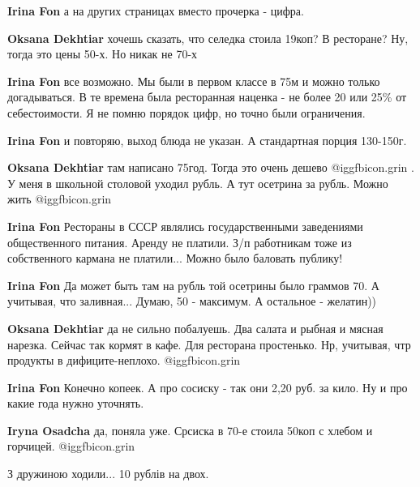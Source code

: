 \begin{itemize}
\begin{itemize}
\begin{itemize}
\textbf{Irina Fon} а на других страницах вместо прочерка - цифра.

\textbf{Oksana Dekhtiar} хочешь сказать, что селедка стоила 19коп? В ресторане? Ну, тогда это цены 50-х. Но никак не 70-х

\textbf{Irina Fon} все возможно. Мы были в первом классе в 75м и можно только догадываться. В те времена была ресторанная наценка - не более 20 или 25\% от себестоимости. Я не помню порядок цифр, но точно были ограничения.

\textbf{Irina Fon} и повторяю, выход блюда не указан. А стандартная порция 130-150г.

\textbf{Oksana Dekhtiar} там написано 75год. Тогда это очень дешево  @igg{fbicon.grin} . У меня в школьной столовой уходил рубль. А тут осетрина за рубль. Можно жить @igg{fbicon.grin} 

\textbf{Irina Fon} Рестораны в СССР являлись государственными заведениями общественного питания. Аренду не платили. З/п работникам тоже из собственного кармана не платили... Можно было баловать публику!

\textbf{Irina Fon} Да может быть там на рубль той осетрины было граммов 70. А учитывая, что заливная... Думаю, 50 - максимум. А остальное - желатин))

\textbf{Oksana Dekhtiar} да не сильно побалуешь. Два салата и рыбная и мясная нарезка. Сейчас так кормят в кафе. Для ресторана простенько. Нр, учитывая, чтр продукты в дифиците-неплохо.  @igg{fbicon.grin} 

\textbf{Irina Fon} Конечно копеек. А про сосиску - так они 2,20 руб. за кило. Ну и про какие года нужно уточнять.

\textbf{Iryna Osadcha} да, поняла уже. Срсиска в 70-е стоила 50коп с хлебом и горчицей.  @igg{fbicon.grin} 
\end{itemize} %

\end{itemize} %


З дружиною ходили... 10 рублів на двох.


\end{itemize} %
